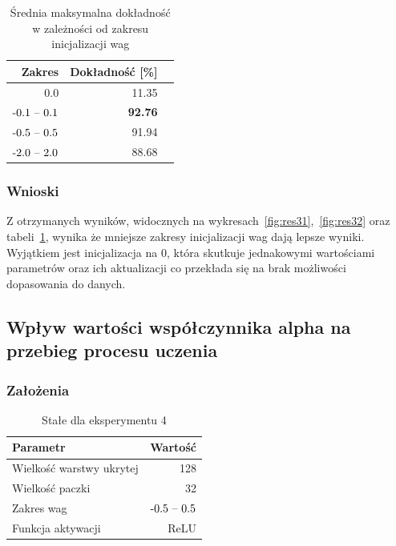 \documentclass{article}
\begin{document}
\begin{table}[H]
	\caption{Średnia maksymalna dokładność w zależności od zakresu inicjalizacji wag}
	\label{tabela-res-31}
	\centering
	\begin{tabular}{rrr}
		\toprule
		Zakres            & Dokładność [\%] \\
		\midrule
		0.0               & 11.35              \\
		\($-0.1 -- 0.1$\) & \textbf{92.76}     \\
		\($-0.5 -- 0.5$\) & 91.94              \\
		\($-2.0 -- 2.0$\) & 88.68              \\
		\bottomrule
	\end{tabular}
\end{table}

\subsubsection*{Wnioski}

Z otrzymanych wyników, widocznych na wykresach~\ref{fig:res31},~\ref{fig:res32} oraz tabeli~\ref{tabela-res-31}, wynika że mniejsze zakresy inicjalizacji wag dają lepsze wyniki. Wyjątkiem jest inicjalizacja na 0, która skutkuje jednakowymi wartościami parametrów oraz ich aktualizacji co przekłada się na brak możliwości dopasowania do danych.

\newpage
\subsection{Wpływ wartości współczynnika alpha na przebieg procesu uczenia}
\subsubsection*{Założenia}
\begin{table}[H]
	\caption{Stałe dla eksperymentu 4}
	\label{tabela-const-4}
	\centering
	\begin{tabular}{lr}
		\toprule
		Parametr                   & Wartość         \\
		\midrule
		Wielkość warstwy ukrytej & 128               \\
		Wielkość paczki          & 32                \\
		Zakres wag                 & \($-0.5 -- 0.5$\) \\
		Funkcja aktywacji          & ReLU              \\
		\bottomrule
	\end{tabular}
\end{table}
\end{document}
